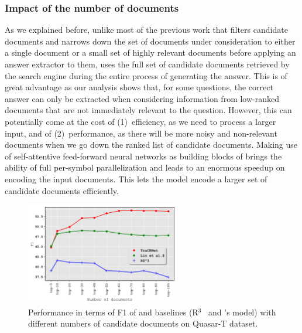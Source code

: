 \subsubsection{Impact of the number of documents}
As we explained before, unlike most of the previous work that filters candidate documents and narrows down the set of documents under consideration to either a single document or a small set of highly relevant documents before applying an answer extractor to them, \tracrnet uses the full set of candidate documents retrieved by the search engine during the entire process of generating the answer. 
This is of great advantage as our analysis shows that, for some questions, the correct answer can only be extracted when considering information from low-ranked documents that are not immediately relevant to the question.
However, this can potentially come at the cost of (1)~efficiency, as we need to process a larger input, and of (2)~performance, as there will be more noisy and non-relevant documents when we go down the ranked list of candidate documents. 
%
Making use of self-attentive feed-forward neural networks as building blocks of \tracrnet brings the ability of full per-symbol parallelization and leads to an enormous speedup on encoding the input documents. This lets the model encode a larger set of candidate documents efficiently. 

\begin{figure}[!t]
 \centering
 \includegraphics[width=0.6\textwidth]{04-part-03/chapter-06/figs_and_tables/plot_different_num_docs.png}
 \caption{Performance in terms of F1 of \tracrnet and baselines (R$^3$~\citep{wang2017r} and \citet{lin2018denoising}'s model) with different numbers of candidate documents on Quasar-T dataset.}
 \label{fig:diff_num_docs}
\end{figure}

